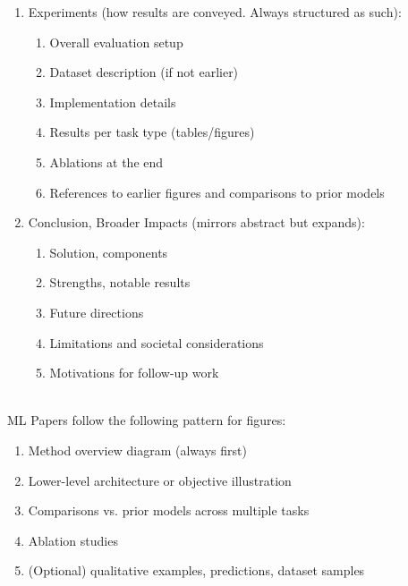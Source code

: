 \begin{remark}
\begin{enumerate}[label=\roman*.]
\begin{enumerate}[label=\arabic*.]
\item Architecture, input/output flow
\item Loss functions, training objectives
\item Implementation details
\item (Sometimes) dataset descriptions or task-specific usage
\end{enumerate}
\item Experiments (how results are conveyed. Always structured as such):
\begin{enumerate}[label=\arabic*.]
\setlength{\itemsep}{0pt}
\item Overall evaluation setup
\item Dataset description (if not earlier)
\item Implementation details
\item Results per task type (tables/figures)
\item Ablations at the end
\item References to earlier figures and comparisons to prior models
\end{enumerate}
\item Conclusion, Broader Impacts (mirrors abstract but expands):
\begin{enumerate}[label=\arabic*.]
\setlength{\itemsep}{0pt}
\item Solution, components
\item Strengths, notable results
\item Future directions
\item Limitations and societal considerations
\item Motivations for follow-up work
\end{enumerate}
\end{enumerate}
\end{remark}

\begin{remark} \\
ML Papers follow the following pattern for figures:
\begin{enumerate}[label=\roman*.]
\setlength{\itemsep}{0pt}
\item Method overview diagram (always first)
\item Lower-level architecture or objective illustration
\item Comparisons vs. prior models across multiple tasks
\item Ablation studies
\item (Optional) qualitative examples, predictions, dataset samples
\end{enumerate}
\end{remark}

